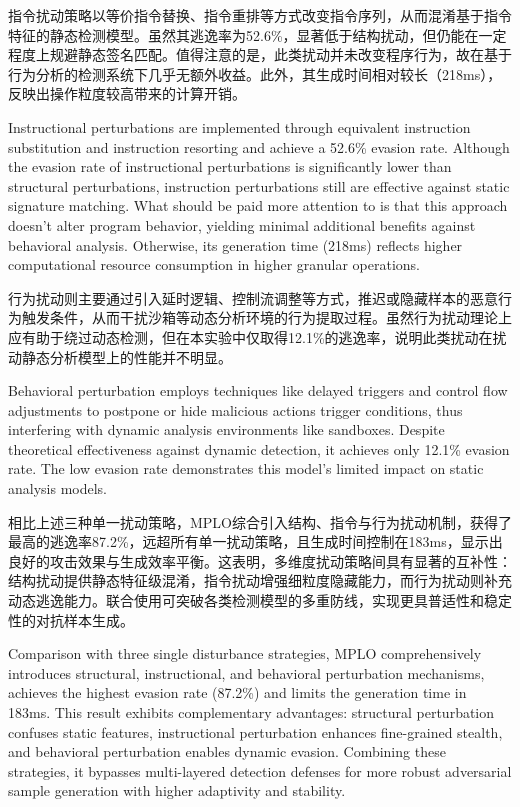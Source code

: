 指令扰动策略以等价指令替换、指令重排等方式改变指令序列，从而混淆基于指令特征的静态检测模型。虽然其逃逸率为52.6\%，显著低于结构扰动，但仍能在一定程度上规避静态签名匹配。值得注意的是，此类扰动并未改变程序行为，故在基于行为分析的检测系统下几乎无额外收益。此外，其生成时间相对较长（218ms），反映出操作粒度较高带来的计算开销。

Instructional perturbations are implemented through equivalent instruction substitution and instruction resorting and achieve a 52.6\% evasion rate. Although the evasion rate of instructional perturbations is significantly lower than structural perturbations, instruction perturbations still are effective against static signature matching. What should be paid more attention to is that this approach doesn't alter program behavior, yielding minimal additional benefits against behavioral analysis. Otherwise, its generation time (218ms) reflects higher computational resource consumption in higher granular operations.

行为扰动则主要通过引入延时逻辑、控制流调整等方式，推迟或隐藏样本的恶意行为触发条件，从而干扰沙箱等动态分析环境的行为提取过程。虽然行为扰动理论上应有助于绕过动态检测，但在本实验中仅取得12.1\%的逃逸率，说明此类扰动在扰动静态分析模型上的性能并不明显。

Behavioral perturbation employs techniques like delayed triggers and control flow adjustments to postpone or hide malicious actions trigger conditions, thus interfering with dynamic analysis environments like sandboxes. Despite theoretical effectiveness against dynamic detection, it achieves only 12.1\% evasion rate. The low evasion rate demonstrates this model's limited impact on static analysis models.

相比上述三种单一扰动策略，MPLO综合引入结构、指令与行为扰动机制，获得了最高的逃逸率87.2\%，远超所有单一扰动策略，且生成时间控制在183ms，显示出良好的攻击效果与生成效率平衡。这表明，多维度扰动策略间具有显著的互补性：结构扰动提供静态特征级混淆，指令扰动增强细粒度隐藏能力，而行为扰动则补充动态逃逸能力。联合使用可突破各类检测模型的多重防线，实现更具普适性和稳定性的对抗样本生成。

Comparison with three single disturbance strategies, MPLO comprehensively introduces structural, instructional, and behavioral perturbation mechanisms, achieves the highest evasion rate (87.2\%) and limits the generation time in 183ms. This result exhibits complementary advantages: structural perturbation confuses static features, instructional perturbation enhances fine-grained stealth, and behavioral perturbation enables dynamic evasion. Combining these strategies, it bypasses multi-layered detection defenses for more robust adversarial sample generation with higher adaptivity and stability.

